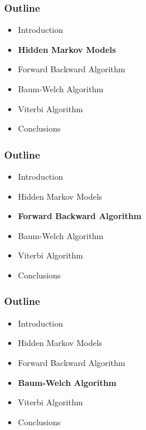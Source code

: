 \documentclass{beamer}
\begin{document}
\begin{frame}
\frametitle{Outline}
\begin{itemize}
\item Introduction
\item\vspace{0.5cm} \textbf{Hidden Markov Models}
\item\vspace{0.5cm} Forward Backward Algorithm
\item \vspace{0.5cm} Baum-Welch Algorithm
\item \vspace{0.5cm} Viterbi Algorithm
\item \vspace{0.5cm} Conclusions
\end{itemize}
\end{frame}

\begin{frame}
\frametitle{Outline}
\begin{itemize}
\item Introduction
\item\vspace{0.5cm} Hidden Markov Models
\item\vspace{0.5cm} \textbf{Forward Backward Algorithm}
\item \vspace{0.5cm} Baum-Welch Algorithm
\item \vspace{0.5cm} Viterbi Algorithm
\item \vspace{0.5cm} Conclusions
\end{itemize}
\end{frame}

\begin{frame}
\frametitle{Outline}
\begin{itemize}
\item Introduction
\item\vspace{0.5cm} Hidden Markov Models
\item\vspace{0.5cm} Forward Backward Algorithm
\item \vspace{0.5cm} \textbf{Baum-Welch Algorithm}
\item \vspace{0.5cm} Viterbi Algorithm
\item \vspace{0.5cm} Conclusions
\end{itemize}
\end{frame}
\end{document}
